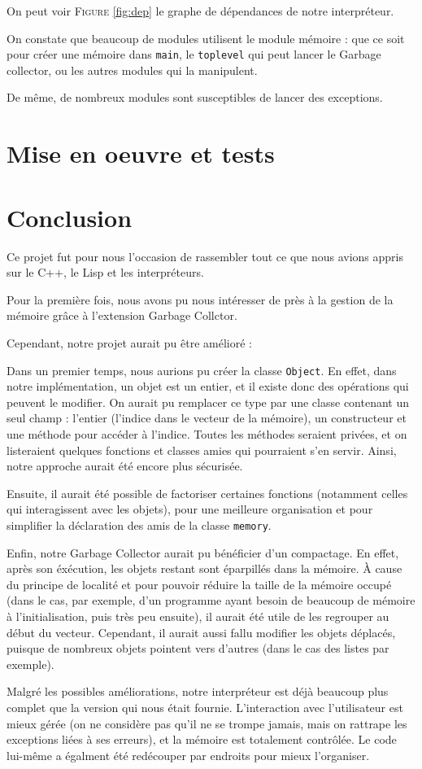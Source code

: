 \documentclass[12pt]{article}
\def\code #1{\lstinline{#1}}
\begin{document}
On peut voir \textsc{Figure} \ref{fig:dep} le graphe de dépendances de notre interpréteur.

On constate que beaucoup de modules utilisent le module mémoire : que ce soit pour créer une mémoire dans \code{main}, le \code{toplevel} qui peut lancer le Garbage collector, ou les autres modules qui la manipulent.

De même, de nombreux modules sont susceptibles de lancer des exceptions.

\section{Mise en oeuvre et tests}

\section{Conclusion}

Ce projet fut pour nous l'occasion de rassembler tout ce que nous avions appris sur le C++, le Lisp et les interpréteurs.

Pour la première fois, nous avons pu nous intéresser de près à la gestion de la mémoire grâce à l'extension Garbage Collctor.


Cependant, notre projet aurait pu être amélioré :

Dans un premier temps, nous aurions pu créer la classe \code{Object}.
En effet, dans notre implémentation, un objet est un entier, et il existe donc des opérations qui peuvent le modifier. On aurait pu remplacer ce type par une classe contenant un seul champ : l'entier (l'indice dans le vecteur de la mémoire), un constructeur et une méthode pour accéder à l'indice. Toutes les méthodes seraient privées, et on listeraient quelques fonctions et classes amies qui pourraient s'en servir. Ainsi, notre approche aurait été encore plus sécurisée.

Ensuite, il aurait été possible de factoriser certaines fonctions (notamment celles qui interagissent avec les objets), pour une meilleure organisation et pour simplifier la déclaration des amis de la classe \code{memory}.

Enfin, notre Garbage Collector aurait pu bénéficier d'un compactage. En effet, après son éxécution, les objets restant sont éparpillés dans la mémoire. À cause du principe de localité et pour pouvoir réduire la taille de la mémoire occupé (dans le cas, par exemple, d'un programme ayant besoin de beaucoup de mémoire à l'initialisation, puis très peu ensuite), il aurait été utile de les regrouper au début du vecteur. Cependant, il aurait aussi fallu modifier les objets déplacés, puisque de nombreux objets pointent vers d'autres (dans le cas des listes par exemple).

Malgré les possibles améliorations, notre interpréteur est déjà beaucoup plus complet que la version qui nous était fournie. L'interaction avec l'utilisateur est mieux gérée (on ne considère pas qu'il ne se trompe jamais, mais on rattrape les exceptions liées à ses erreurs), et la mémoire est totalement contrôlée. Le code lui-même a égalment été redécouper par endroits pour mieux l'organiser.
\end{document}
